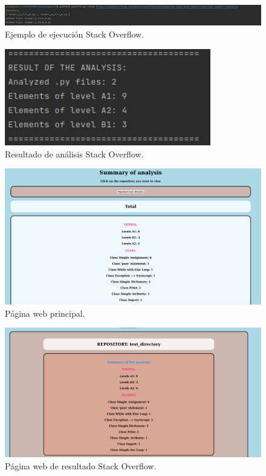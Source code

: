 \documentclass[a4paper, 12pt]{book}
\begin{document}
\begin{figure}
  \centering
  \includegraphics[width=1\textwidth]{img/uso6.png}
  \caption{Ejemplo de ejecución Stack Overflow.}\label{fig:uso6}
\end{figure}

\begin{figure}
  \centering
  \includegraphics[width=9cm, keepaspectratio]{img/uso7.png}
  \caption{Resultado de análisis Stack Overflow.}\label{fig:uso7}
\end{figure}

\begin{figure}
  \centering
  \includegraphics[width=1\textwidth]{img/uso8.png}
  \caption{Página web principal.}\label{fig:uso8}
\end{figure}

\begin{figure}
  \centering
  \includegraphics[width=1\textwidth]{img/uso9.png}
  \caption{Página web de resultado Stack Overflow.}\label{fig:uso9}
\end{figure}
\end{document}
